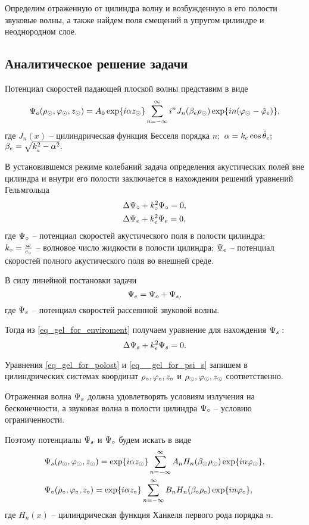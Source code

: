 Определим отраженную от цилиндра волну и возбужденную в его полости звуковые волны, а также найдем поля смещений в упругом цилиндре и неоднородном слое.

\newpage
\subsection{Аналитическое решение задачи}

Потенциал скоростей падающей плоской волны представим в виде
$$\P\o(\r\cyl, \f\cyl, z\cyl)=A_0\exp\{i\alpha  z\cyl\}\sum_{n=-\infty}^{\infty}i^nJ_n(\beta\en  \r\cyl)\exp\{in(\f\cyl-\hat\f\en)\},$$
где $J_n(x)$ -- цилиндрическая функция Бесселя порядка $n;$ $\alpha=k\en\cos\hat\theta\en;$ \\$\beta\en=\sqrt{k_{\en}^2-\alpha^2}.$

В установившемся режиме колебаний задача определения акустических полей вне цилиндра и внутри его полости заключается в нахождении решений уравнений Гельмгольца
\begin{align}
&\Lap\P\c+k\c^2\P\c=0\label{eq_gel_for_polost},\\
&\Lap\P\en+k\en^2\P\en=0\label{eq_gel_for_enviroment},
\end{align}
где $\P\c$ -- потенциал скоростей акустического поля в полости цилиндра;\\ $k\c=\frac{\omega}{c\c}$ -- волновое число жидкости в полости цилиндра;
$\P\en$ -- потенциал скоростей полного акустического поля во внешней среде. 

В силу линейной постановки задачи
\begin{equation}
\P\en=\P\o+\P_s,
\end{equation}
где $\P_s$ -- потенциал скоростей рассеянной звуковой волны.

Тогда из \eqref{eq_gel_for_enviroment} получаем уравнение для нахождения $\P_s:$
\begin{equation}\label{eq__gel_for_psi_s}
\Lap\P_s+k\en^2\P_s=0.
\end{equation}

Уравнения \eqref{eq_gel_for_polost} и \eqref{eq__gel_for_psi_s} запишем в цилиндрических системах координат $\r\c, \f\c, z\c$ и $\r\cyl, \f\cyl, z\cyl$ соответственно. 

Отраженная волна $\P_s$ должна удовлетворять условиям излучения на бесконечности, а звуковая волна в полости цилиндра $\P\c$ -- условию ограниченности.

Поэтому потенциалы $\P_s$ и $\P\c$ будем искать в виде
\begin{align}
&\P_s(\r\cyl, \f\cyl, z\cyl)= \exp\{i\alpha z\cyl\}\sum_{n=-\infty}^{\infty}A_nH_n(\beta\cyl \r\cyl)\exp\{in\f\cyl\},\label{razloj_psi_s}\\
&\P\c(\r\c, \f\c, z\c)= \exp\{i\alpha z\c\}\sum_{n=-\infty}^{\infty}B_nH_n(\beta\c \r\c)\exp\{in\f\c\},\label{razloj_psi_o}
\end{align}
где $H_n(x)$ -- цилиндрическая функция Ханкеля первого рода порядка $n.$

